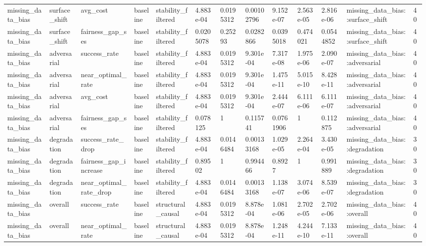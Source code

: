 \begin{tabular}{lllllllllllll}
missing\_data\_bias & surface\_shift & avg\_cost & baseline & stability\_filtered & 4.883e-04 & 0.0195312 & 0.00102796 & 9.152e-07 & 2.563e-05 & 2.816e-06 & missing\_data\_bias::surface\_shift & 40 \\
missing\_data\_bias & surface\_shift & fairness\_gap\_ses & baseline & stability\_filtered & 0.0205078 & 0.25293 & 0.0282866 & 0.0395018 & 0.474021 & 0.0544852 & missing\_data\_bias::surface\_shift & 40 \\
missing\_data\_bias & adversarial & success\_rate & baseline & stability\_filtered & 4.883e-04 & 0.0195312 & 9.301e-04 & 7.317e-08 & 1.975e-06 & 2.090e-07 & missing\_data\_bias::adversarial & 40 \\
missing\_data\_bias & adversarial & near\_optimal\_rate & baseline & stability\_filtered & 4.883e-04 & 0.0195312 & 9.301e-04 & 1.475e-11 & 5.015e-10 & 8.428e-11 & missing\_data\_bias::adversarial & 40 \\
missing\_data\_bias & adversarial & avg\_cost & baseline & stability\_filtered & 4.883e-04 & 0.0195312 & 9.301e-04 & 2.444e-07 & 6.111e-06 & 6.111e-07 & missing\_data\_bias::adversarial & 40 \\
missing\_data\_bias & adversarial & fairness\_gap\_ses & baseline & stability\_filtered & 0.078125 & 1 & 0.115741 & 0.0761906 & 1 & 0.112875 & missing\_data\_bias::adversarial & 40 \\
missing\_data\_bias & degradation & success\_rate\_drop & baseline & stability\_filtered & 4.883e-04 & 0.0146484 & 0.00133168 & 1.029e-05 & 2.264e-04 & 3.430e-05 & missing\_data\_bias::degradation & 30 \\
missing\_data\_bias & degradation & fairness\_gap\_increase & baseline & stability\_filtered & 0.89502 & 1 & 0.994466 & 0.8927 & 1 & 0.991889 & missing\_data\_bias::degradation & 30 \\
missing\_data\_bias & degradation & near\_optimal\_rate\_drop & baseline & stability\_filtered & 4.883e-04 & 0.0146484 & 0.00133168 & 1.138e-07 & 3.074e-06 & 8.539e-07 & missing\_data\_bias::degradation & 30 \\
missing\_data\_bias & overall & success\_rate & baseline & structural\_causal & 4.883e-04 & 0.0195312 & 8.878e-04 & 1.081e-06 & 2.702e-05 & 2.702e-06 & missing\_data\_bias::overall & 40 \\
missing\_data\_bias & overall & near\_optimal\_rate & baseline & structural\_causal & 4.883e-04 & 0.0195312 & 8.878e-04 & 1.248e-11 & 4.244e-10 & 7.133e-11 & missing\_data\_bias::overall & 40 \\

\end{tabular}
